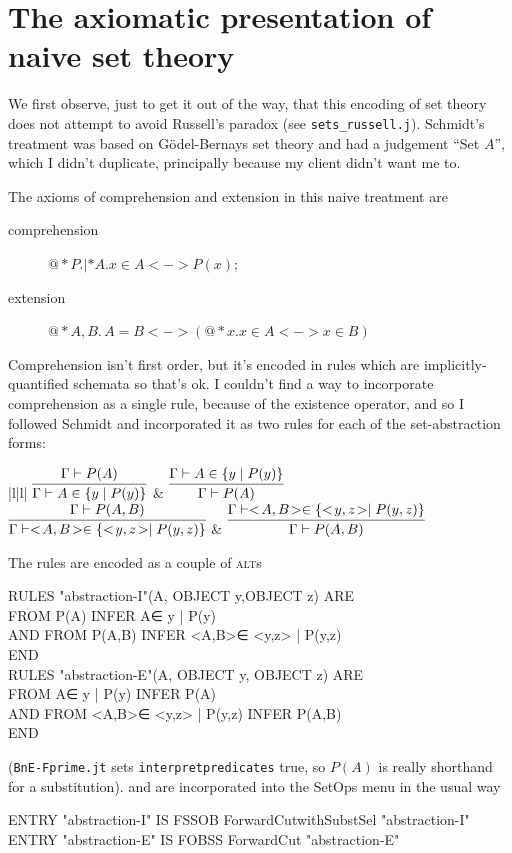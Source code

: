 \section{The axiomatic presentation of naive set theory}

We first observe, just to get it out of the way, that this encoding of set theory does not attempt to avoid Russell's paradox (see \texttt{sets\_russell.j}). Schmidt's treatment was based on G\"{o}del-Bernays set theory and had a judgement ``Set $A$'', which I didn't duplicate, principally because my client didn't want me to.

The axioms of comprehension and extension in this naive treatment are
\begin{description}
\item[comprehension] $@*P.|*A.x\in A<->P(x)$;
\item[extension] $@*A,B.\,A=B<->(@*x.x\in A<->x\in B)$
\end{description}
Comprehension isn't first order, but it's encoded in rules which are implicitly-quantified schemata so that's ok. I couldn't find a way to incorporate comprehension as a single rule, because of the existence operator, and so I followed Schmidt and incorporated it as two rules for each of the set-abstraction forms:
\begin{ruletab}{|l|l|} 
\hline
$\infer
       {\Gamma  |- A\in \{ y \mid P( y) \} }
       {\Gamma  |- P(A) }$ 
& 
$\infer
       {\Gamma |- P(A) }
       {\Gamma  |- A\in \{ y \mid P( y) \} } $
\\
\hline 
$\infer
       {\Gamma  |- <\! A,B\!> \in \{ <\!y,z\!>  \mid P(y,z) \} }
       {\Gamma  |- P(A,B) }$ 
& 
$\infer
       {\Gamma  |- P(A,B) }
       {\Gamma  |- <\! A,B\!> \in \{ <\! y,z\!>  \mid P( y,z) \} }$
\\
\hline 
\end{ruletab}

The rules are encoded as a couple of \textsc{alt}s
\begin{japeish}
RULES "abstraction-I"(A, OBJECT y,OBJECT z) ARE  \\
\tab \tab FROM P(A) INFER A∈{ y | P(y) } \\
\tab AND FROM P(A,B) INFER <A,B>∈{ <y,z> | P(y,z) } \\
END \\
RULES "abstraction-E"(A, OBJECT y, OBJECT z) ARE \\
\tab \tab FROM A∈{ y | P(y) } INFER P(A)  \\
\tab AND FROM <A,B>∈{ <y,z> | P(y,z) } INFER P(A,B) \\
END
\end{japeish}
(\texttt{BnE-Fprime.jt} sets \texttt{interpretpredicates} true, so $P(A)$ is really shorthand for a substitution).
and are incorporated into the SetOps menu in the usual way
\begin{japeish}
ENTRY "abstraction-I" IS FSSOB ForwardCutwithSubstSel "abstraction-I"\\
ENTRY "abstraction-E" IS FOBSS ForwardCut "abstraction-E"
\end{japeish}

